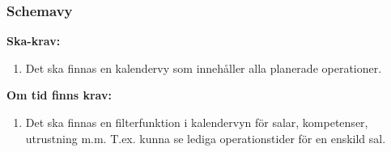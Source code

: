 \documentclass{article}
\begin{document}
\subsubsection{Schemavy}
\textbf{Ska-krav: }
\begin{enumerate}
\item Det ska finnas en kalendervy som innehåller alla planerade operationer.
\end{enumerate}
\textbf{Om tid finns krav:}
\begin{enumerate}
\item Det ska finnas en filterfunktion i kalendervyn för salar, kompetenser, utrustning m.m. T.ex. kunna se lediga operationstider för en enskild sal.
\end{enumerate}




\appendix


\end{document}
